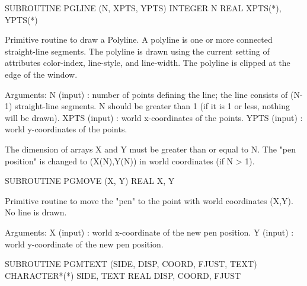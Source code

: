 {\eightpoint\begintt
      SUBROUTINE PGLINE (N, XPTS, YPTS)
      INTEGER  N
      REAL     XPTS(*), YPTS(*)
 
Primitive routine to draw a Polyline. A polyline is one or more
connected straight-line segments.  The polyline is drawn using
the current setting of attributes color-index, line-style, and
line-width. The polyline is clipped at the edge of the window.
 
Arguments:
 N      (input)  : number of points defining the line; the line
                   consists of (N-1) straight-line segments.
                   N should be greater than 1 (if it is 1 or less,
                   nothing will be drawn).
 XPTS   (input)  : world x-coordinates of the points.
 YPTS   (input)  : world y-coordinates of the points.
 
The dimension of arrays X and Y must be greater than or equal to N.
The "pen position" is changed to (X(N),Y(N)) in world coordinates
(if N > 1).
\endtt}

{\eightpoint\begintt
      SUBROUTINE PGMOVE (X, Y)
      REAL X, Y
 
Primitive routine to move the "pen" to the point with world
coordinates (X,Y). No line is drawn.
 
Arguments:
 X      (input)  : world x-coordinate of the new pen position.
 Y      (input)  : world y-coordinate of the new pen position.
\endtt}

{\eightpoint\begintt
      SUBROUTINE PGMTEXT (SIDE, DISP, COORD, FJUST, TEXT)
      CHARACTER*(*) SIDE, TEXT
      REAL DISP, COORD, FJUST
\endtt}

